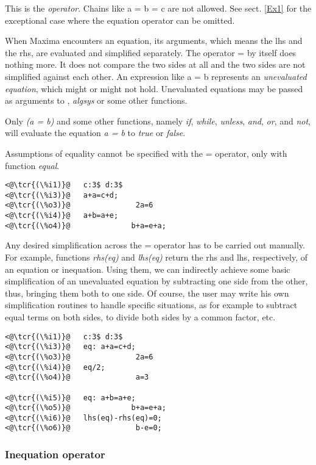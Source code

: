 \documentclass[../Maxima_Workbook.tex]{subfiles}
\begin{document}
\lz This is the  \emph{operator}. Chains like a = b = c are not allowed. See sect. \ref{Ex1} for the exceptional case where the equation operator can be omitted.

\lz When Maxima encounters an equation, its arguments, which means the lhs and the rhs, are evaluated and simplified separately. The operator = by itself does nothing more. It does not compare the two sides at all and the two sides are not simplified against each other. An expression like a = b represents an \emph{unevaluated equation}, which might or might not hold. Unevaluated equations may be passed as arguments to , \emph{algsys} or some other functions.

\lz Only \emph{(a = b)} and some other functions, namely \emph{if}, \emph{while}, \emph{unless}, \emph{and}, \emph{or}, and \emph{not}, will evaluate the equation \emph{a = b} to \emph{true} or \emph{false}.

\lz Assumptions of equality cannot be specified with the = operator, only with function \emph{equal}.

\lz \begin{lstlisting}
<@\tcr{(\%i1)}@   c:3$ d:3$
<@\tcr{(\%i3)}@   a+a=c+d;
<@\tcr{(\%o3)}@			      2a=6
<@\tcr{(\%i4)}@   a+b=a+e;
<@\tcr{(\%o4)}@			     b+a=e+a;
\end{lstlisting}

\lz Any desired simplification across the = operator has to be carried out manually. For example, functions \emph{rhs(eq)} and \emph{lhs(eq)} return the rhs and lhs, respectively, of an equation or inequation. Using them, we can indirectly achieve some basic simplification of an unevaluated equation by subtracting one side from the other, thus, bringing them both to one side. Of course, the user may write his own simplification routines to handle specific situations, as for example to subtract equal terms on both sides, to divide both sides by a common factor, etc.

\lz \begin{lstlisting}
<@\tcr{(\%i1)}@   c:3$ d:3$
<@\tcr{(\%i3)}@   eq: a+a=c+d;
<@\tcr{(\%o3)}@			      2a=6
<@\tcr{(\%i4)}@   eq/2;
<@\tcr{(\%o4)}@			      a=3

<@\tcr{(\%i5)}@   eq: a+b=a+e;
<@\tcr{(\%o5)}@			     b+a=e+a;
<@\tcr{(\%i6)}@   lhs(eq)-rhs(eq)=0;
<@\tcr{(\%o6)}@			      b-e=0;
\end{lstlisting}

\subsubsection{Inequation operator}
\end{document}
